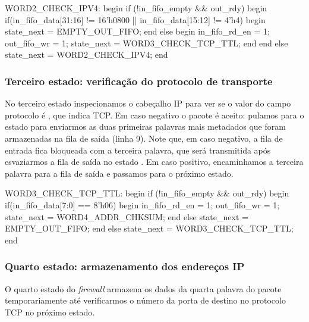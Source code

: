 
\begin{verilogcode}
  WORD2_CHECK_IPV4: begin
     if (!in_fifo_empty && out_rdy) begin
        if(in_fifo_data[31:16] != 16'h0800 ||
              in_fifo_data[15:12] != 4'h4) begin
           state_next = EMPTY_OUT_FIFO;
        end
        else begin
           in_fifo_rd_en = 1;
           out_fifo_wr = 1;
           state_next = WORD3_CHECK_TCP_TTL;
        end
     end
     else
        state_next = WORD2_CHECK_IPV4;
  end
\end{verilogcode}

\subsubsection*{Terceiro estado: verificação do protocolo de transporte}

No terceiro estado inspecionamos o cabeçalho IP para ver se o valor
do campo protocolo é , que indica TCP.  Em caso negativo o
pacote é aceito: pulamos para o estado  para
enviarmos as duas primeiras palavras mais metadados que foram
armazenadas na fila de saída (linha 9).  Note que, em caso negativo,
a fila de entrada fica bloqueada com a terceira palavra, que será
transmitida após esvaziarmos a fila de saída no estado
.  Em caso positivo, encaminhamos a terceira
palavra para a fila de saída e passamos para o próximo estado.

\begin{verilogcode}
  WORD3_CHECK_TCP_TTL: begin
     if (!in_fifo_empty && out_rdy) begin
        if(in_fifo_data[7:0] == 8'h06) begin
           in_fifo_rd_en = 1;
           out_fifo_wr = 1;
           state_next = WORD4_ADDR_CHKSUM;
        end
        else
           state_next = EMPTY_OUT_FIFO;
     end
     else
        state_next = WORD3_CHECK_TCP_TTL;
  end
\end{verilogcode}

\subsubsection*{Quarto estado: armazenamento dos endereços IP}

O quarto estado do \emph{firewall} armazena os dados da quarta
palavra do pacote temporariamente até verificarmos o número da porta
de destino no protocolo TCP no próximo estado.

